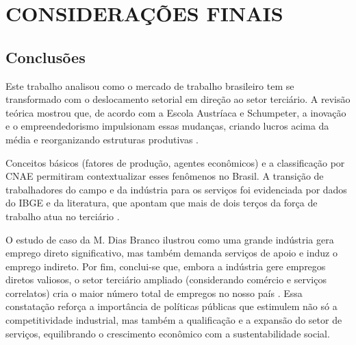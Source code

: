 \chapter{CONSIDERAÇÕES FINAIS} \label{cap:conclusoes}

\section{Conclusões}

Este trabalho analisou como o mercado de trabalho brasileiro tem se transformado com o deslocamento setorial em direção ao setor terciário. A revisão teórica mostrou que, de acordo com a Escola Austríaca e Schumpeter, a inovação e o empreendedorismo impulsionam essas mudanças, criando lucros acima da média e reorganizando estruturas produtivas \cite{iorio2013, silva2025}.

Conceitos básicos (fatores de produção, agentes econômicos) e a classificação por CNAE permitiram contextualizar esses fenômenos no Brasil. A transição de trabalhadores do campo e da indústria para os serviços foi evidenciada por dados do IBGE e da literatura, que apontam que mais de dois terços da força de trabalho atua no terciário \cite{sescap2017, politize2024a}.

O estudo de caso da M. Dias Branco ilustrou como uma grande indústria gera emprego direto significativo, mas também demanda serviços de apoio e induz o emprego indireto. Por fim, conclui-se que, embora a indústria gere empregos diretos valiosos, o setor terciário ampliado (considerando comércio e serviços correlatos) cria o maior número total de empregos no nosso país \cite{sescap2017, dgabc2002}. Essa constatação reforça a importância de políticas públicas que estimulem não só a competitividade industrial, mas também a qualificação e a expansão do setor de serviços, equilibrando o crescimento econômico com a sustentabilidade social.


